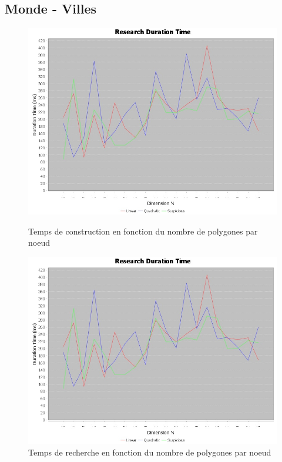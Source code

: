 \documentclass {article}
\begin{document}
\newpage
\subsection {Monde - Villes}\label{mondeVilles}
\begin{figure}[h]
    \begin{minipage}[t]{0.46\textwidth}
	\centering
	\includegraphics[width=\textwidth]{research_graph_belgium.png}
	\caption{Temps de construction en fonction du nombre de polygones par noeud}
	\label{fig:belgique_stat_find_lin}
    \end{minipage}
    \begin{minipage}[t]{0.46\textwidth}
	\centering
	\includegraphics[width=\textwidth]{research_graph_belgium.png}
	\caption{Temps de recherche en fonction du nombre de polygones par noeud}
	\label{fig:belgique_stat_find_quad}
    \end{minipage}
\end{figure}
\end{document}
